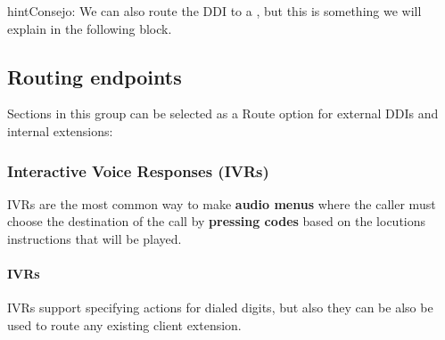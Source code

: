 \documentclass[letterpaper,10pt,spanish]{sphinxmanual}
\begin{document}
\begin{notice}{hint}{Consejo:}
We can also route the DDI to a {\hyperref[administration_portal/client/vpbx/faxes:faxing\string-system]{}}, but
this is something we will explain in the following block.
\end{notice}


\subsection{Routing endpoints}
\label{administration_portal/client/vpbx/routing_endpoints/index:routing-endpoints}\label{administration_portal/client/vpbx/routing_endpoints/index::doc}
Sections in this group can be selected as a Route option for external DDIs and internal extensions:


\subsubsection{Interactive Voice Responses (IVRs)}
\label{administration_portal/client/vpbx/routing_endpoints/ivrs:interactive-voice-responses-ivrs}\label{administration_portal/client/vpbx/routing_endpoints/ivrs::doc}
IVRs are the most common way to make \textbf{audio menus} where the caller must
choose the destination of the call by \textbf{pressing codes} based on the locutions
instructions that will be played.


\paragraph{IVRs}
\label{administration_portal/client/vpbx/routing_endpoints/ivrs:ivrs}\label{administration_portal/client/vpbx/routing_endpoints/ivrs:id1}
IVRs support specifying actions for dialed digits, but also they can be also be used
to route any existing client extension.
\end{document}
